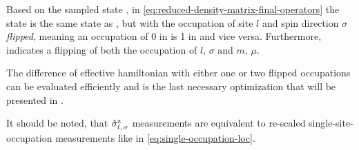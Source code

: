 Based on the sampled state \ketN[N], in \autoref{eq:reduced-density-matrix-final-operators} the state  is the same state as \ketN[N], but with the occupation of site $l$ and spin direction $\sigma$ \emph{flipped}, meaning an occupation of 0 in \ketN[N] is 1 in  and vice versa.
Furthermore,  indicates a flipping of both the occupation of $l,\, \sigma$ and $m,\, \mu$.

The difference of effective hamiltonian with either one or two flipped occupations can be evaluated efficiently and is the last necessary optimization that will be presented in .

It should be noted, that $\pauli[l,\,\sigma]{z}$ measurements are equivalent to re-scaled single-site-occupation measurements like in \autoref{eq:single-occupation-loc}.
